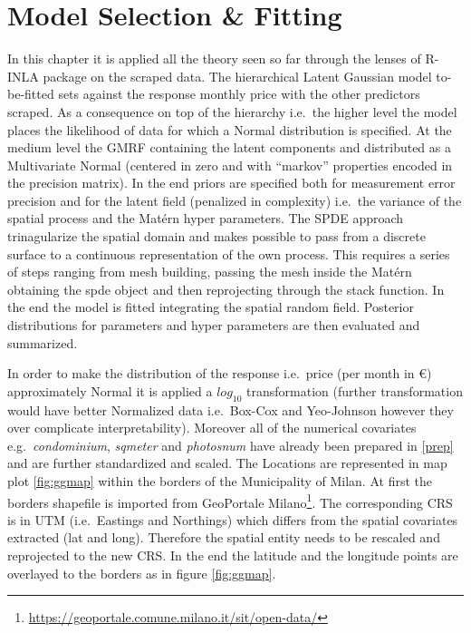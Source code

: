 \documentclass[
  12pt,
  a4paper,
  oneside]{book}
\DeclareRobustCommand{\href}[2]{#2\footnote{\url{#1}}}
\theoremstyle{definition}
\theoremstyle{definition}
\theoremstyle{definition}
\theoremstyle{remark}
\begin{document}
\hypertarget{modelspec}{%
\chapter{Model Selection \& Fitting}\label{modelspec}}

In this chapter it is applied all the theory seen so far through the lenses of R-INLA package on the scraped data. The hierarchical Latent Gaussian model to-be-fitted sets against the response monthly price with the other predictors scraped. As a consequence on top of the hierarchy i.e.~the higher level the model places the likelihood of data for which a Normal distribution is specified. At the medium level the GMRF containing the latent components and distributed as a Multivariate Normal (centered in zero and with ``markov'' properties encoded in the precision matrix). In the end priors are specified both for measurement error precision and for the latent field (penalized in complexity) i.e.~the variance of the spatial process and the Matérn hyper parameters. The SPDE approach trinagularize the spatial domain and makes possible to pass from a discrete surface to a continuous representation of the own process. This requires a series of steps ranging from mesh building, passing the mesh inside the Matérn obtaining the spde object and then reprojecting through the stack function. In the end the model is fitted integrating the spatial random field. Posterior distributions for parameters and hyper parameters are then evaluated and summarized.

In order to make the distribution of the response i.e.~price (per month in €) approximately Normal it is applied a \(log_{10}\) transformation (further transformation would have better Normalized data i.e.~Box-Cox \citep{boxcox} and Yeo-Johnson \citep{yeojohnson} however they over complicate interpretability). Moreover all of the numerical covariates e.g.~\emph{condominium}, \emph{sqmeter} and \emph{photosnum} have already been prepared in \ref{prep} and are further standardized and scaled. The Locations are represented in map plot \ref{fig:ggmap} within the borders of the Municipality of Milan. At first the borders shapefile is imported from \href{https://geoportale.comune.milano.it/sit/open-data/}{GeoPortale Milano}. The corresponding CRS is in UTM (i.e.~Eastings and Northings) which differs from the spatial covariates extracted (lat and long). Therefore the spatial entity needs to be rescaled and reprojected to the new CRS. In the end the latitude and the longitude points are overlayed to the borders as in figure \ref{fig:ggmap}.
\end{document}
